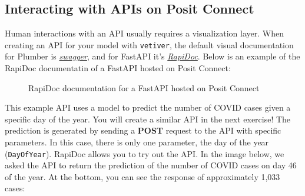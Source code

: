 \documentclass[
  letterpaper,
  DIV=11,
  numbers=noendperiod]{scrreprt}
\begin{document}
\subsection{Interacting with APIs on Posit
Connect}\label{interacting-with-apis-on-posit-connect}

Human interactions with an API usually requires a visualization layer.
When creating an API for your model with \texttt{vetiver}, the default
visual documentation for Plumber is
\href{https://swagger.io/}{\emph{swagger}}, and for FastAPI it's
\href{https://rapidocweb.com/}{\emph{RapiDoc}}. Below is an example of
the RapiDoc documentatin of a FastAPI hosted on Posit Connect:

\begin{figure}


\caption{\label{fig-fastapi-rapidoc}RapiDoc documentation for a FastAPI
hosted on Posit Connect}

\end{figure}%

This example API uses a model to predict the number of COVID cases given
a specific day of the year. You will create a similar API in the next
exercise! The prediction is generated by sending a \textbf{POST} request
to the API with specific parameters. In this case, there is only one
parameter, the day of the year (\texttt{DayOfYear}). RapiDoc allows you
to try out the API. In the image below, we asked the API to return the
prediction of the number of COVID cases on day 46 of the year. At the
bottom, you can see the response of approximately 1,033 cases:
\end{document}
